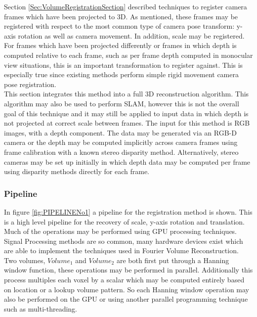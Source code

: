 
Section \ref{Sec:VolumeRegistrationSection} described techniques to register camera frames which have been projected to 3D. As mentioned, these frames may be registered with respect to the most common type of camera pose transform: y-axis rotation as well as camera movement. In addition, scale may be registered. For frames which have been projected differently or frames in which depth is computed relative to each frame, such as per frame depth computed in monocular view situations, this is an important transformation to register against. This is especially true since existing methods perform simple rigid movement camera pose registration. \\

This section integrates this method into a full 3D reconstruction algorithm. This algorithm may also be used to perform SLAM, however this is not the overall goal of this technique and it may still be applied to input data in which depth is not projected at correct scale between frames. The input for this method is RGB images, with a depth component. The data may be generated via an RGB-D camera or the depth may be computed implicitly across camera frames using frame calibration with a known stereo disparity method. Alternatively, stereo cameras may be set up initially in which depth data may be computed per frame using disparity methods directly for each frame. \\

\subsubsection{Pipeline}

\label{sec:FVRPipelineSect}

In figure \ref{fig:PIPELINENo1} a pipeline for the registration method is shown. This is a high level pipeline for the recovery of scale, y-axis rotation and translation. Much of the operations may be performed using GPU processing techniques. Signal Processing methods are so common, many hardware devices exist which are able to implement the techniques used in Fourier Volume Reconstruction. \\

Two volumes, $Volume_1$ and $Volume_2$ are both first put through a Hanning window function, these operations may be performed in parallel. Additionally this process multiples each voxel by a scalar which may be computed entirely based on location or a lookup volume pattern. So each Hanning window operation may also be performed on the GPU or using another parallel programming technique such as multi-threading. \\

